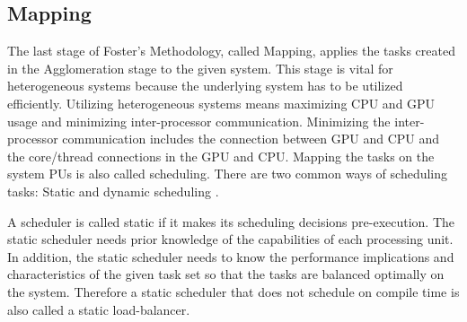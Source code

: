  

\subsection{Mapping}
The last stage of Foster's Methodology, called Mapping, applies the tasks created in the Agglomeration stage to the given system. This stage is vital for heterogeneous systems because the underlying system has to be utilized efficiently. Utilizing heterogeneous systems means maximizing CPU and GPU usage and minimizing inter-processor communication. Minimizing the inter-processor communication includes the connection between GPU and CPU and the core/thread connections in the GPU and CPU.
Mapping the tasks on the system PUs is also called scheduling. There are two common ways of scheduling tasks: Static and dynamic scheduling \cite{kopetzRealTimeScheduling1997}.

A scheduler is called static if it makes its scheduling decisions pre-execution. The static scheduler needs prior knowledge of the capabilities of each processing unit. In addition, the static scheduler needs to know the performance implications and characteristics of the given task set so that the tasks are balanced optimally on the system. Therefore a static scheduler that does not schedule on compile time is also called a static load-balancer.

